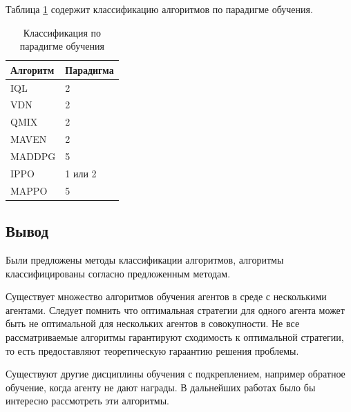 
Таблица \ref{tab:paradigms} содержит классификацию алгоритмов по парадигме обучения.

\begin{table}[H]
	\centering
	\caption{Классификация по парадигме обучения}
	\label{tab:paradigms}
	\begin{tabular}{@{}|l|l|@{}}
	\toprule
	Алгоритм & Парадигма \\ \midrule
	IQL      & 2         \\
	VDN      & 2         \\
	QMIX     & 2         \\
	MAVEN    & 2         \\
	MADDPG   & 5         \\ 
	IPPO     & 1 или 2   \\
	MAPPO    & 5         \\
	\bottomrule
	\end{tabular}
\end{table}

\subsection*{Вывод}

Были предложены методы классификации алгоритмов, алгоритмы классифицированы согласно предложенным методам.


Существует множество алгоритмов обучения агентов в среде с несколькими агентами.
Следует помнить что оптимальная стратегии для одного агента может быть не оптимальной для нескольких агентов в совокупности.
Не все рассматриваемые алгоритмы гарантируют сходимость к оптимальной стратегии, то есть предоставляют теоретическую гараантию решения проблемы.

Существуют другие дисциплины обучения с подкреплением, например обратное обучение, когда агенту не дают награды. В дальнейших работах было бы интересно рассмотреть эти алгоритмы.